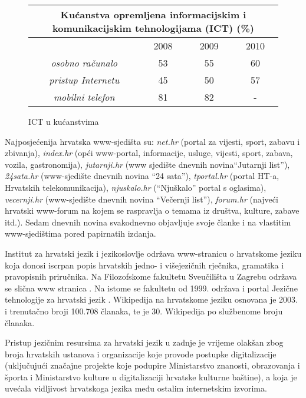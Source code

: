 \begin{multicols}{2}
\begin{figure*}[htb]
\centering
	\begin{tabular}{|c|c|c|c|}
        \hline
      \multicolumn{4}{|c|}{\textbf{Kućanstva opremljena informacijskim i komunikacijskim tehnologijama (ICT) (\%)}} \\ \hline
        ~                                              & 2008 & 2009 & 2010 \\ \hline
        \emph{osobno računalo}   & 53   & 55   & 60   \\ \hline
        \emph{pristup Internetu} & 45   & 50   & 57   \\ \hline
        \emph{mobilni telefon}   & 81   & 82   & -    \\
        \hline
   \end{tabular}
  \caption{ICT u kućanstvima}
  \label{fig:IST_kuc}
\end{figure*}

Najposjećenija hrvatska www-sjedišta su: \emph{net.hr} (portal za vijesti, sport, zabavu i zbivanja), \emph{index.hr} (opći www-portal, informacije, usluge, vijesti, sport, zabava, vozila, gastronomija), \emph{jutarnji.hr} (www sjedište dnevnih novina“Jutarnji list”), \emph{24sata.hr} (www-sjedište dnevnih novina “24 sata”), \emph{tportal.hr} (portal HT-a, Hrvatskih telekomunikacija), \emph{njuskalo.hr} (“Njuškalo” portal s oglasima), \emph{vecernji.hr} (www-sjedište dnevnih novina “Večernji list”), \emph{forum.hr} (najveći hrvatski www-forum na kojem se raspravlja o temama iz društva, kulture, zabave itd.). Sedam dnevnih novina svakodnevno objavljuje svoje članke i na vlastitim www-sjedištima pored papirnatih izdanja.


Institut za hrvatski jezik i jezikoslovlje održava www-stranicu o hrvatskome jeziku koja donosi iscrpan popis hrvatskih jedno- i višejezičnih rječnika, gramatika i pravopisnih priručnika. Na Filozofskome fakultetu Sveučilišta u Zagrebu održava se slična www stranica \cite{str11}. Na istome se fakultetu od 1999. održava i portal Jezične tehnologije za hrvatski jezik \cite{str12}.
Wikipedija na hrvatskome jeziku osnovana je 2003. i trenutačno broji 100.708 članaka, te je 30. Wikipedija po službenome broju članaka.

Pristup jezičnim resursima za hrvatski jezik u zadnje je vrijeme olakšan zbog broja hrvatskih ustanova i organizacije koje provode postupke digitalizacije (uključujući značajne projekte koje podupire Ministarstvo znanosti, obrazovanja i športa i Ministarstvo kulture u digitalizaciji hrvatske kulturne baštine), a koja je uvećala vidljivost hrvatskoga jezika među ostalim internetskim izvorima.


\end{multicols}

